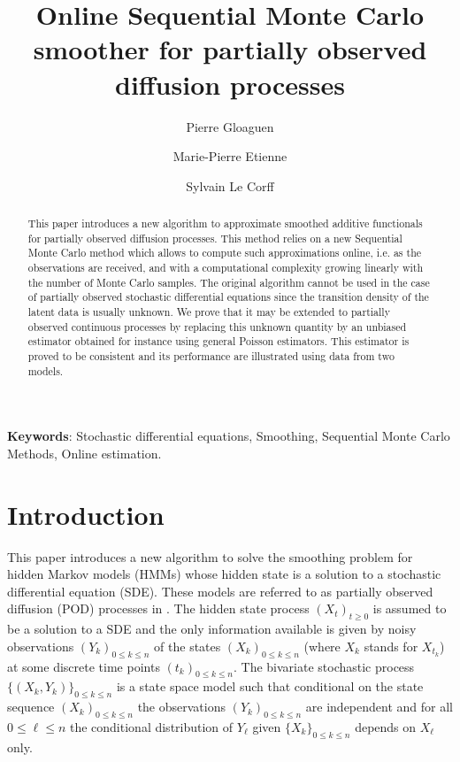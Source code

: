 \documentclass[12pt]{article}
\newcommand{\1}{\mathrm{1}}
\begin{document}
\author{Pierre Gloaguen\footnotemark[1] \and Marie-Pierre Etienne\footnotemark[1] \and Sylvain Le {C}orff\footnotemark[2]}
 


\title{Online Sequential Monte Carlo smoother for partially observed diffusion processes}


\maketitle

\begin{abstract}
This paper introduces a new algorithm to approximate smoothed additive functionals for partially observed diffusion processes. 
This method relies on a new Sequential Monte Carlo method which allows to compute such approximations online, i.e. as the observations are received, and with a computational complexity growing linearly with the number of Monte Carlo samples. The original algorithm cannot be used in the case of partially observed stochastic differential equations since the transition density of the latent data is usually unknown. 
We prove that it may be extended to partially observed continuous processes by replacing this unknown quantity by an unbiased estimator obtained for instance using general Poisson estimators. 
This estimator is proved to be consistent and its performance are illustrated using data from two models. 
\end{abstract}

{\bf Keywords}: Stochastic differential equations, Smoothing, Sequential Monte Carlo Methods, Online estimation. 

\section{Introduction}
This paper introduces a new algorithm to solve the smoothing problem for hidden Markov models (HMMs) whose hidden state is a solution to a stochastic differential equation (SDE). These models are referred to as partially observed diffusion (POD) processes in \cite{olsson:strojby:2011}. The hidden state process $(X_t)_{t\ge 0}$ is assumed to be a solution to a SDE and the only information available is given by noisy observations $(Y_{k})_{0\le k\le n}$ of the states $(X_k)_{0\le k\le  n}$ (where $X_k$ stands for $X_{t_k}$) at some discrete time points $(t_k)_{0\le k\le n}$. The bivariate stochastic process $\{(X_{k},Y_{k})\}_{0\le k\le n}$ is a state space model such that conditional on the state sequence $(X_{k})_{0\le k\le n}$ the observations $(Y_{k})_{0\le k\le n}$ are independent and for all $0\le \ell\le n$ the conditional distribution of $Y_{\ell}$ given $\{X_{k}\}_{0\le k\le n}$ depends on $X_{\ell}$ only.
\end{document}
